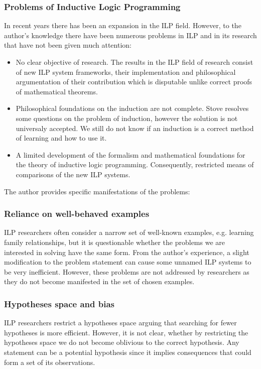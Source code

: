 \subsubsection{Problems of Inductive Logic Programming}
In recent years there has been an expansion in the ILP field. However, to the author's knowledge there have been numerous problems in ILP and in its research that have not been given much attention:

\begin{itemize}
\item No clear objective of research. The results in the ILP field of research consist of new ILP system frameworks, their implementation and philosophical argumentation of their contribution which is disputable unlike correct proofs of mathematical theorems.
\item Philosophical foundations on the induction are not complete. Stove \cite{stove1986rationality} resolves some questions on the problem of induction, however the solution is not universaly accepted. We still do not know if an induction is a correct method of learning and how to use it.
\item A limited development of the formalism and mathematical foundations for the theory of inductive logic programming. Consequently, restricted means of comparisons of the new ILP systems.
\end{itemize}

The author provides specific manifestations of the problems:

\subsubsection{Reliance on well-behaved examples}
ILP researchers often consider a narrow set of well-known examples, e.g. learning family relationships, but it is questionable whether the problems we are interested in solving have the same form. From the author's experience, a slight modification to the problem statement can cause some unnamed ILP systems to be very inefficient. However, these problems are not addressed by researchers as they do not become manifested in the set of chosen examples.

\subsubsection{Hypotheses space and bias}
ILP researchers restrict a hypotheses space arguing that searching for fewer hypotheses is more efficient. However, it is not clear, whether by restricting the hypotheses space we do not become oblivious to the correct hypothesis. Any statement can be a potential hypothesis since it implies consequences that could form a set of its observations.

